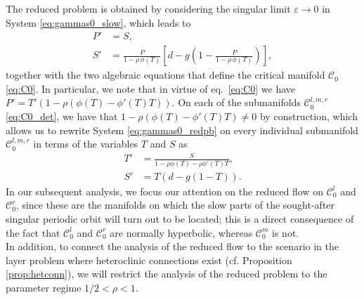 \documentclass[a4paper,10pt,abstract=true,parskip=true]{scrartcl}
\theoremstyle{remark}
\numberwithin{equation}{section}
\numberwithin{thm}{section}
\newcommand{\eps}{\varepsilon}
\begin{document}
The reduced problem is obtained by considering the singular limit $\eps \to 0$ in System \eqref{eq:gammas0_slow}, which leads to
\begin{subequations}\label{eq:gammas0_redpb}
    \begin{align}
        P' &= S,\\
        S' &= \frac{P}{1 - \rho\,\phi(T)}\left[d - g \left(1-\frac{P}{1 - \rho\,\phi(T)}\right)\right],
    \end{align}
\end{subequations}
together with the two algebraic equations that define the critical manifold $\mathcal{C}_0$ \eqref{eq:C0}.
In particular, we note that in virtue of eq.~\eqref{eq:C0} we have $P' = T'(1-\rho(\phi(T)-\phi'(T)T))$. On each of the submanifolds $\mathcal{C}_0^{l,m,r}$ \eqref{eq:C0_det}, we have that $1-\rho(\phi(T)-\phi'(T)T) \neq 0$ by construction, which allows us to rewrite System \eqref{eq:gammas0_redpb} on every individual submanifold $\mathcal{C}_0^{l,m,r}$ in terms of the variables $T$ and $S$ as
\begin{subequations}\label{eq:gammas0_redpb_new}
    \begin{align}
        T' &= \frac{S}{1-\rho \phi(T)-\rho \phi'(T)T},\\
        S' &= T\left( d-g(1-T)\right).
    \end{align}
\end{subequations}
In our subsequent analysis, we focus our attention on the reduced flow on $\mathcal{C}_0^l$ and $\mathcal{C}_0^r$, since these are the manifolds on which the slow parts of the sought-after singular periodic orbit will turn out to be located; this is a direct consequence of the fact that $\mathcal{C}_0^l$ and $\mathcal{C}_0^r$ are normally hyperbolic, whereas $\mathcal{C}_0^m$ is not.\\
In addition, to connect the analysis of the reduced flow to the scenario in the layer problem where heteroclinic connections exist (cf. Proposition \ref{prop:hetconn}), we will restrict the analysis of the reduced problem to the parameter regime $1/2 < \rho < 1$.\\
\end{document}
